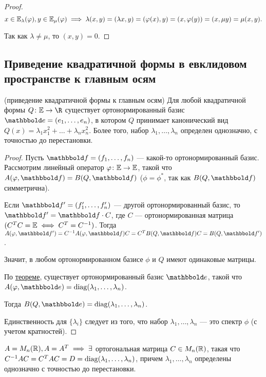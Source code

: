 \begin{proof}
    \begin{equation*}
        x \in \mathbb{E}_\lambda(\varphi), y \in \mathbb{E}_\mu(\varphi) \implies \lambda(x, y) = (\lambda x, y) = (\varphi(x), y) = (x, \varphi(y)) = (x, \mu y) = \mu (x, y)
    .\end{equation*}

    Так как $\lambda \neq \mu$, то $(x, y) = 0$.
\end{proof}


\subsection{Приведение квадратичной формы в евклидовом пространстве к главным осям}

\begin{theorem}{(приведение квадратичной формы к главным осям)}
    Для любой квадратичной формы $Q \colon \EE \to \R$ существует ортонормированный базис $\E = (e_1, \dots, e_n)$, в котором $Q$ принимает канонический вид $Q(x) = \lambda_1 x_1^2 + \dots+ \lambda_n x_n^2$.
    Более того, набор $\lambda_1, \dots, \lambda_n$ определен однозначно, с точностью до перестановки.
\end{theorem}


\begin{proof}
    Пусть $\F = (f_1, \dots, f_n)$ --- какой-то ортонормированный базис. Рассмотрим линейный оператор $\varphi \colon \mathbb{E} \to \mathbb{E}$, такой что $A(\phi, \F) = B(Q, \F)$ ($\phi = \phi^{*}$, так как $B(Q, \F)$ симметрична).

    Если $\F' = (f_1', \dots, f_n')$ --- другой ортонормированный базис, то $\F' = \F \cdot C$, где $C$ --- ортонормированная матрица $(C^{T} C = \mathbb{E} \iff C^{T} = C^{-1})$.
    Тогда $A(\phi, \F') = C^{-1} A(\phi, \F) C = C^{T} B(Q, \F) C = B(Q, \F')$.

    Значит, в любом ортонормированном базисе $\phi$ и $Q$ имеют одинаковые матрицы.

    \medskip
    По \hyperref[lec30:th]{теореме}, существует ортонормированный базис $\E$, такой что $A(\phi, \E) = \diag(\lambda_1, \dots, \lambda_n)$.

    Тогда $B(Q, \E) = \diag(\lambda_1, \dots, \lambda_n)$.

    Единственность для $ \{\lambda_i\}$ следует из того, что набор $\lambda_1, \dots, \lambda_n$ --- это спектр $\phi$ (с учетом кратностей).
\end{proof}

\begin{corollary}
    $A = M_n(\mathbb{R}), A = A^{T} \implies \exists $ ортогональная матрица $C \in M_n(\mathbb{R})$, такая что $C^{-1} A C = C^{T} A C = D = \operatorname{\mathop{\mathrm{diag}}}(\lambda_1, \dots, \lambda_n)$, причем $\lambda_1, \dots, \lambda_n$ определены однозначно с точностью до перестановки.
\end{corollary}


